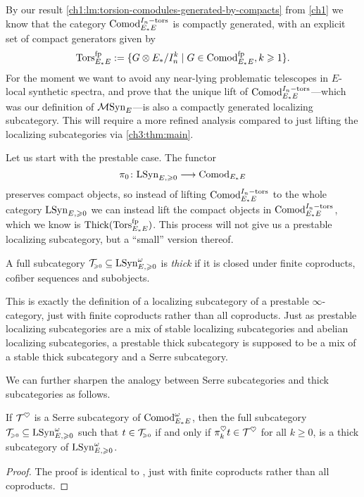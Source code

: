 By our result \cref{ch1:lm:torsion-comodules-generated-by-compacts} from \cref{ch1} we know that the category $\mathrm{Comod}_{E_*E}^{I_n-\mathrm{tors}}$ is compactly generated, with an explicit set of compact generators given by 
\[\mathrm{Tors}_{E_*E}^{\mathrm{fp}} := \{G\otimes E_*/I_n^k \mid G\in \mathrm{Comod}_{E_*E}^{\mathrm{fp}}, k\geqslant 1\}.\]
For the moment we want to avoid any near-lying problematic telescopes in $E$-local synthetic spectra, and prove that the unique lift of $\mathrm{Comod}_{E_*E}^{I_n-\mathrm{tors}}$---which was our definition of $\mathcal{M}\mathrm{Syn}_{E}$---is also a compactly generated localizing subcategory. This will require a more refined analysis compared to just lifting the localizing subcategories via \cref{ch3:thm:main}. 

Let us start with the prestable case. The functor 
\[\pi_0 \colon \mathrm{LSyn}_{E, \geqslant 0} \longrightarrow \mathrm{Comod}_{E_*E}\]
preserves compact objects, so instead of lifting $\mathrm{Comod}_{E_*E}^{I_n-\mathrm{tors}}$ to the whole category $\mathrm{LSyn}_{E, \geqslant 0}$ we can instead lift the compact objects in $\mathrm{Comod}_{E_*E}^{I_n-\mathrm{tors}}$, which we know is $\operatorname{Thick}(\mathrm{Tors}_{E_*E}^{\mathrm{fp}})$. This process will not give us a prestable localizing subcategory, but a ``small'' version thereof. 

\begin{definition}
    A full subcategory $\mathcal{T}_{\hspace{-1pt}\scriptscriptstyle\geqslant 0} \subseteq \mathrm{LSyn}_{E, \geqslant 0}^\omega$ is \emph{thick} if it is closed under finite coproducts, cofiber sequences and subobjects. 
\end{definition}

\begin{remark}
    This is exactly the definition of a localizing subcategory of a prestable $\infty$-category, just with finite coproducts rather than all coproducts. Just as prestable localizing subcategories are a mix of stable localizing subcategories and abelian localizing subcategories, a prestable thick subcategory is supposed to be a mix of a stable thick subcategory and a Serre subcategory. 
\end{remark}

We can further sharpen the analogy between Serre subcategories and thick subcategories as follows. 

\begin{lemma}
    If $\mathcal{T}^\heartsuit$ is a Serre subcategory of $\mathrm{Comod}_{E_*E}^\omega$, then the full subcategory $\mathcal{T}_{\hspace{-1pt}\scriptscriptstyle\geqslant 0}\subseteq \mathrm{LSyn}_{E, \geqslant 0}^\omega$ such that $t\in \mathcal{T}_{\hspace{-1pt}\scriptscriptstyle\geqslant 0}$ if and only if $\pi^\heartsuit_k t \in \mathcal{T}^\heartsuit$ for all $k\geq 0$, is a thick subcategory of $\mathrm{LSyn}_{E, \geqslant 0}^\omega$. 
\end{lemma}
\begin{proof}
    The proof is identical to \cite[C.5.2.7]{lurie_SAG}, just with finite coproducts rather than all coproducts. 
\end{proof}

